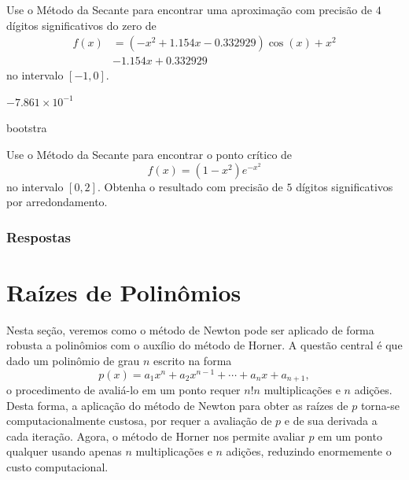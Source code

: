 \begin{exer}
  Use o Método da Secante para encontrar uma aproximação com precisão de $4$ dígitos significativos do zero de 
  \begin{equation}
    \begin{aligned}
      f(x) &= (-x^2+1.154x-0.332929)\cos(x) + x^2 \\
      &- 1.154x + 0.332929
  \end{aligned}
  \end{equation}
  no intervalo $[-1, 0]$.
\end{exer}
\begin{resp}
  $-7.861\times 10^{-1}$
\end{resp}
bootstra
\begin{exer}
  Use o Método da Secante para encontrar o ponto crítico de
  \begin{equation}
    f(x) = (1-x^2)e^{-x^2}
  \end{equation}
  no intervalo $[0, 2]$. Obtenha o resultado com precisão de $5$ dígitos significativos por arredondamento.
\end{exer}

\ifisbook
\subsubsection{Respostas}
\shipoutAnswer
\fi


\section{Raízes de Polinômios}\label{cap_eq1d_sec_raizes}
\badgeRevisar

Nesta seção, veremos como o método de Newton pode ser aplicado de forma robusta a polinômios com o auxílio do método de Horner. A questão central é que dado um polinômio de grau $n$ escrito na forma
\begin{equation}
  p(x) = a_{1}x^n + a_{2}x^{n-1} + \cdots + a_nx + a_{n+1},
\end{equation}
o procedimento de avaliá-lo em um ponto requer $n!n$ multiplicações e $n$ adições. Desta forma, a aplicação do método de Newton para obter as raízes de $p$ torna-se computacionalmente custosa, por requer a avaliação de $p$ e de sua derivada a cada iteração. Agora, o método de Horner nos permite avaliar $p$ em um ponto qualquer usando apenas $n$ multiplicações e $n$ adições, reduzindo enormemente o custo computacional.

